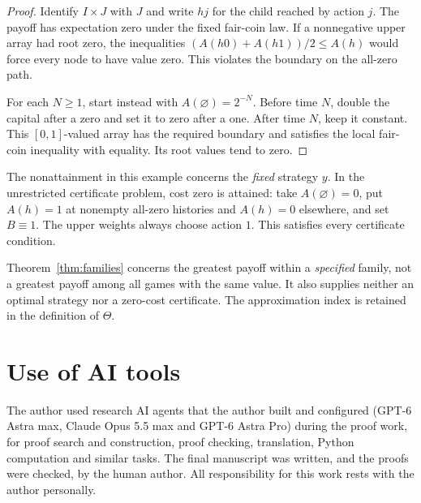 \documentclass[11pt,a4paper]{article}
\theoremstyle{definition}
\theoremstyle{remark}
\begin{document}
\begin{proof}
Identify $I\times J$ with $J$ and write $hj$ for the child reached
by action $j$. The payoff has expectation zero under the fixed
fair-coin law. If a
nonnegative upper array had root zero, the inequalities
$(A(h0)+A(h1))/2\leq A(h)$ would force every node to have value zero.
This violates the boundary on the all-zero path.

For each $N\geq1$, start instead with $A(\varnothing)=2^{-N}$.
Before time $N$, double the capital after a zero and set it to zero
after a one. After time $N$, keep it constant. This $[0,1]$-valued
array has the required boundary and satisfies the local fair-coin
inequality with equality. Its root values tend to zero.
\end{proof}

The nonattainment in this example concerns the \emph{fixed} strategy
$y$. In the unrestricted certificate problem, cost zero is attained:
take $A(\varnothing)=0$, put $A(h)=1$ at nonempty all-zero histories
and $A(h)=0$ elsewhere, and set $B\equiv1$. The upper weights always
choose action $1$. This satisfies every certificate condition.

Theorem~\ref{thm:families} concerns the greatest payoff within a
\emph{specified} family, not a greatest payoff among all games with
the same value. It also supplies neither an optimal strategy nor a
zero-cost certificate. The approximation index is retained in the
definition of $\Theta$.

\section*{Use of AI tools}
The author used research AI agents that the author built and configured (GPT-6 Astra max,
Claude Opus 5.5 max and GPT-6 Astra Pro) during the proof work, for proof search and
construction, proof checking, translation, Python computation and similar tasks. The final
manuscript was written, and the proofs were checked, by the human author. All responsibility
for this work rests with the author personally.
\end{document}
